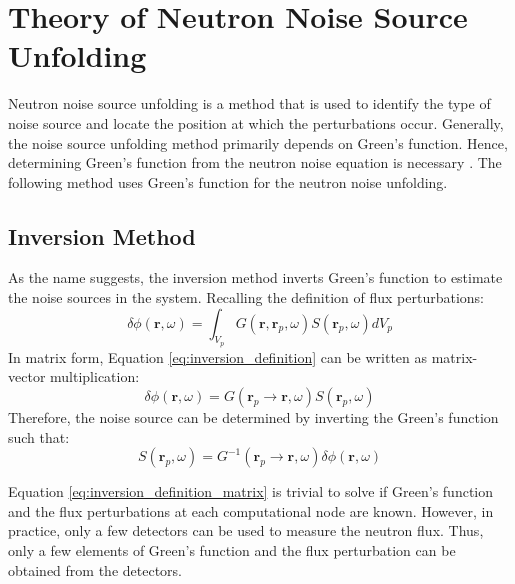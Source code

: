 \label{ch:noise_HTTR}

\section{Theory of Neutron Noise Source Unfolding}
\label{sec:unfolding_theory}
Neutron noise source unfolding is a method that is used to identify the type of noise source and locate the position at which the perturbations occur. Generally, the noise source unfolding method primarily depends on Green’s function. Hence, determining Green’s function from the neutron noise equation is necessary \cite{demaziereIdentificationLocalizationAbsorbers2005}. The following method uses Green’s function for the neutron noise unfolding.

\subsection{Inversion Method}

As the name suggests, the inversion method inverts Green’s function to estimate the noise sources in the system. Recalling the definition of flux perturbations:
\begin{equation}
    \delta \phi (\textbf{r},\omega) = \int_{V_p} G(\textbf{r}, \textbf{r}_p, \omega) S(\textbf{r}_p, \omega) dV_p
    \label{eq:inversion_definition}
\end{equation}
In matrix form, Equation \ref{eq:inversion_definition} can be written as matrix-vector multiplication:
\begin{equation}
    \delta \phi (\textbf{r},\omega) = G(\textbf{r}_p \rightarrow \textbf{r}, \omega) S(\textbf{r}_p, \omega)
    \label{eq:inversion_definition_matrix}
\end{equation}
Therefore, the noise source can be determined by inverting the Green’s function such that:
\begin{equation}
    S(\textbf{r}_p, \omega) = G^{-1}(\textbf{r}_p \rightarrow \textbf{r}, \omega) \delta \phi (\textbf{r},\omega) 
    \label{eq:source_inversion_matrix}
\end{equation}

Equation \ref{eq:inversion_definition_matrix} is trivial to solve if Green’s function and the flux perturbations at each computational node are known. However, in practice, only a few detectors can be used to measure the neutron flux. Thus, only a few elements of Green’s function and the flux perturbation can be obtained from the detectors. 

